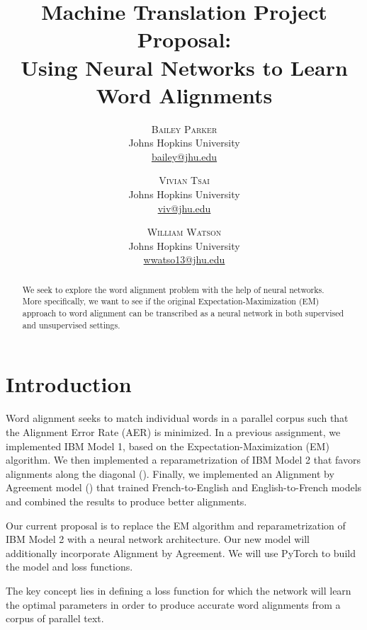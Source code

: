 \documentclass[twoside,twocolumn]{article}
\title{Machine Translation Project Proposal: \\ Using Neural Networks to Learn
Word Alignments}
\author{%
\textsc{Bailey Parker} \\[1ex]
\normalsize Johns Hopkins University \\
\normalsize \href{mailto:bailey@jhu.edu}{bailey@jhu.edu}
 \and
 \textsc{Vivian Tsai} \\[1ex]
\normalsize Johns Hopkins University \\
\normalsize \href{mailto:viv@jhu.edu}{viv@jhu.edu}
 \and
  \textsc{William Watson} \\[1ex]
\normalsize Johns Hopkins University \\
\normalsize \href{mailto:wwatso13@jhu.edu}{wwatso13@jhu.edu}
}
\date{}
\begin{document}
\maketitle




\begin{abstract}
We seek to explore the word alignment problem with the help of neural networks.
More specifically, we want to see if the original Expectation-Maximization
(EM) approach to word alignment can be transcribed as a neural network in both
supervised and unsupervised settings. %
\end{abstract}



\section{Introduction}

Word alignment seeks to match individual words in a parallel corpus such that
the Alignment Error Rate (AER) is minimized. In a previous assignment, we
implemented IBM Model 1, based on the Expectation-Maximization (EM)
algorithm. We then implemented a reparametrization of IBM Model 2 that favors
alignments along the diagonal (\cite{dyer2013simple}). Finally, we implemented an
Alignment by Agreement model (\cite{liang2006alignment}) that trained
French-to-English and English-to-French models and combined the results
to produce better alignments.

Our current proposal is to replace the EM algorithm and
reparametrization of IBM Model 2 with a neural network architecture. Our new
model will additionally incorporate Alignment by Agreement. We will use
PyTorch to build the model and loss functions.

The key concept lies in defining a loss function for which the network will
learn the optimal parameters in order to produce accurate word alignments
from a corpus of parallel text.
\end{document}
